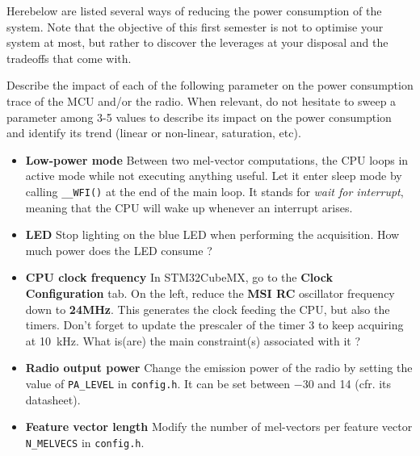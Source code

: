 Herebelow are listed several ways of reducing the power consumption of the system. Note that the objective of this first semester is not to optimise your system at most, but rather to discover the leverages at your disposal and the tradeoffs that come with.

Describe the impact of each of the following parameter on the power consumption trace of the MCU and/or the radio. When relevant, do not hesitate to sweep a parameter among 3-5 values to describe its impact on the power consumption and identify its trend (linear or non-linear, saturation, etc).

\begin{itemize}
	\item{\textbf{Low-power mode}} Between two mel-vector computations, the CPU loops in active mode while not executing anything useful. Let it enter sleep mode by calling \texttt{\_\_WFI()} at the end of the main loop. It stands for \textit{wait for interrupt}, meaning that the CPU will wake up whenever an interrupt arises.
	\item{\textbf{LED}} Stop lighting on the blue LED when performing the acquisition. How much power does the LED consume ?
	\item{\textbf{CPU clock frequency}} In STM32CubeMX, go to the \textbf{Clock Configuration} tab. On the left, reduce the \textbf{MSI RC} oscillator frequency down to \textbf{24MHz}. This generates the clock feeding the CPU, but also the timers. Don't forget to update the prescaler of the timer 3 to keep acquiring at \SI{10}{\kilo\hertz}. What is(are) the main constraint(s) associated with it ?
	\item{\textbf{Radio output power}} Change the emission power of the radio by setting the value of \texttt{PA\_LEVEL} in \texttt{config.h}. It can be set between \SI{-30}{\dBm} and \SI{14}{\dBm} (cfr. its datasheet).
	\item{\textbf{Feature vector length}} Modify the number of mel-vectors per feature vector \texttt{N\_MELVECS} in \texttt{config.h}.
\end{itemize}

